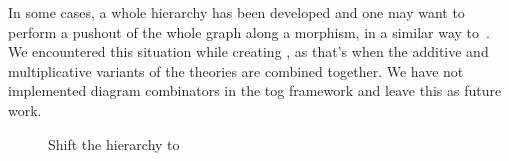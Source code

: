 In some cases, a whole hierarchy has been developed and one may want to perform a pushout of the whole graph along a morphism, in a similar way to~\cite{cicm2019diagrams}. We encountered this situation while creating , as that's when the additive and multiplicative variants of the theories are combined together. We have not implemented diagram combinators in the tog framework and leave this as future work. 
\begin{figure}[h]
\caption{Shift the  hierarchy to }
\label{fig:shiftPMtoRingoid}
\end{figure}

